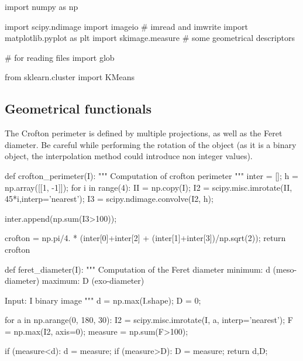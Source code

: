 \def\QRCODE{TB_IPR_TUT.IMG.shape_diagrams_pythonqrcode.png}
\def\QRPAGE{http://www.iptutorials.science/tree/master/TB_IPR/TUT.IMG.shape_diagrams/python}

\begin{python}
import numpy as np

import scipy.ndimage
import imageio # imread and imwrite
import matplotlib.pyplot as plt
import skimage.measure # some geometrical descriptors

# for reading files
import glob

from sklearn.cluster import KMeans
\end{python}

%
\subsection{Geometrical functionals}


The Crofton perimeter is defined by multiple projections, as well as the Feret diameter. Be careful while performing the rotation of the object (as it is a binary object, the interpolation method could introduce non integer values).

\begin{python}
def crofton_perimeter(I):
    """ Computation of crofton perimeter
    """
    inter = [];
    h = np.array([[1, -1]]);
    for i in range(4):
        II = np.copy(I);
        I2 = scipy.misc.imrotate(II, 45*i,interp='nearest');
        I3 = scipy.ndimage.convolve(I2, h);
        
        inter.append(np.sum(I3>100));
        
        
    crofton = np.pi/4. * (inter[0]+inter[2] + (inter[1]+inter[3])/np.sqrt(2));
    return crofton

\end{python}

\begin{python}
def feret_diameter(I):
    """ 
    Computation of the Feret diameter
    minimum: d (meso-diameter)
    maximum: D (exo-diameter)
    
    Input: I binary image
    """
    d = np.max(I.shape);
    D = 0;
    
    for a in np.arange(0, 180, 30):
        I2 = scipy.misc.imrotate(I, a, interp='nearest');
        F = np.max(I2, axis=0);
        measure = np.sum(F>100);
        
        if (measure<d):
            d = measure;
        if (measure>D):
            D = measure;
    return d,D;
\end{python}

